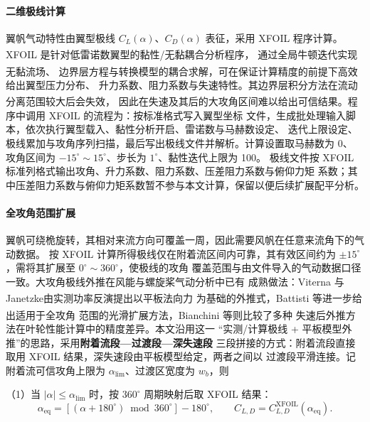 \documentclass[UTF8,a4paper,twoside,zihao=5,fontset=windows]{ctexart}
\begin{document}
\paragraph{二维极线计算}
翼帆气动特性由翼型极线 $C_L(\alpha)$、$C_D(\alpha)$ 表征，采用 XFOIL 程序计算。
XFOIL 是针对低雷诺数翼型的黏性/无黏耦合分析程序\textsuperscript{\cite{drela1989}}，
通过全局牛顿迭代实现无黏流场、
边界层方程与转换模型的耦合求解\textsuperscript{\cite{drela1987}}，可在保证计算精度的前提下高效给出翼型压力分布、
升力系数、阻力系数与失速特性。其边界层积分方法在流动分离范围较大后会失效，
因此在失速及其后的大攻角区间难以给出可信结果\textsuperscript{\cite{drela1987,timmer2008}}。程序中调用 XFOIL 的流程为：按标准格式写入翼型坐标
文件，生成批处理输入脚本，依次执行翼型载入、黏性分析开启、雷诺数与马赫数设定、
迭代上限设定、极线累加与攻角序列扫描，最后写出极线文件并解析。计算设置取马赫数为 0、
攻角区间为 $-15^{\circ}\sim15^{\circ}$、步长为 $1^{\circ}$、黏性迭代上限为 100。
极线文件按 XFOIL 标准列格式输出攻角、升力系数、阻力系数、压差阻力系数与俯仰力矩
系数；其中压差阻力系数与俯仰力矩系数暂不参与本文计算，保留以便后续扩展配平分析。


\paragraph{全攻角范围扩展}
翼帆可绕桅旋转，其相对来流方向可覆盖一周，因此需要风帆在任意来流角下的气动数据。
按 XFOIL 计算所得极线仅在附着流区间内可靠，其有效区间约为
$\pm15^{\circ}$，需将其扩展至 $0^{\circ}\sim360^{\circ}$，使极线的攻角
覆盖范围与由文件导入的气动数据口径一致。大攻角极线外推在风能与螺旋桨气动分析中已有
成熟做法：Viterna 与 Janetzke\textsuperscript{\cite{viterna1982}}由实测功率反演提出以平板法向力
为基础的外推式，Battisti 等\textsuperscript{\cite{battisti2020}}进一步给出适用于全攻角
范围的光滑扩展方法，Bianchini 等\textsuperscript{\cite{bianchini2016}}则比较了多种
失速后外推方法在叶轮性能计算中的精度差异。本文沿用这一
“实测/计算极线 + 平板模型外推”的思路，采用\textbf{附着流段—过渡段—深失速段}
三段拼接的方式：附着流段直接取用 XFOIL 结果，深失速段由平板模型给定，两者之间以
过渡段平滑连接。记附着流可信攻角上限为 $\alpha_{\lim}$、过渡区宽度为 $w_b$，则

（1）当 $|\alpha|\le\alpha_{\lim}$ 时，按 $360^{\circ}$ 周期映射后取 XFOIL 结果：
\begin{equation}
\alpha_{\mathrm{eq}}=\left[\left(\alpha+180^{\circ}\right)\bmod 360^{\circ}\right]-180^{\circ},
\qquad C_{L,D}=C_{L,D}^{\mathrm{XFOIL}}\!\left(\alpha_{\mathrm{eq}}\right).
\label{eq:polar_xfoil}
\end{equation}
\end{document}
